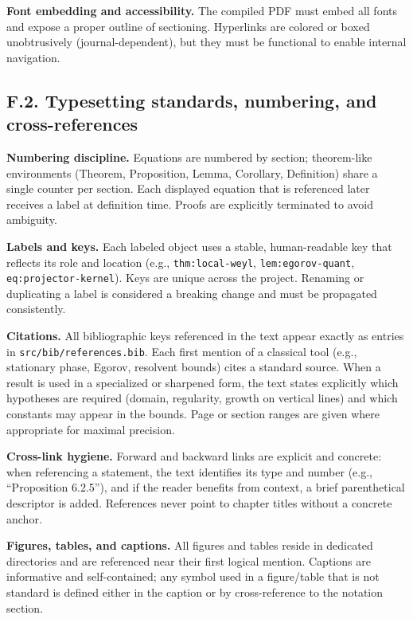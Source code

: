 \medskip
\noindent \textbf{Font embedding and accessibility.}
The compiled PDF must embed all fonts and expose a proper outline of sectioning. Hyperlinks are colored or boxed unobtrusively (journal-dependent), but they must be functional to enable internal navigation.

\subsection*{F.2. Typesetting standards, numbering, and cross-references}

\noindent \textbf{Numbering discipline.}
Equations are numbered by section; theorem-like environments (Theorem, Proposition, Lemma, Corollary, Definition) share a single counter per section. Each displayed equation that is referenced later receives a label at definition time. Proofs are explicitly terminated to avoid ambiguity.

\medskip
\noindent \textbf{Labels and keys.}
Each labeled object uses a stable, human-readable key that reflects its role and location (e.g., \texttt{thm:local-weyl}, \texttt{lem:egorov-quant}, \texttt{eq:projector-kernel}). Keys are unique across the project. Renaming or duplicating a label is considered a breaking change and must be propagated consistently.

\medskip
\noindent \textbf{Citations.}
All bibliographic keys referenced in the text appear exactly as entries in \texttt{src/bib/references.bib}. Each first mention of a classical tool (e.g., stationary phase, Egorov, resolvent bounds) cites a standard source. When a result is used in a specialized or sharpened form, the text states explicitly which hypotheses are required (domain, regularity, growth on vertical lines) and which constants may appear in the bounds. Page or section ranges are given where appropriate for maximal precision.

\medskip
\noindent \textbf{Cross-link hygiene.}
Forward and backward links are explicit and concrete: when referencing a statement, the text identifies its type and number (e.g., “Proposition 6.2.5”), and if the reader benefits from context, a brief parenthetical descriptor is added. References never point to chapter titles without a concrete anchor.

\medskip
\noindent \textbf{Figures, tables, and captions.}
All figures and tables reside in dedicated directories and are referenced near their first logical mention. Captions are informative and self-contained; any symbol used in a figure/table that is not standard is defined either in the caption or by cross-reference to the notation section.


